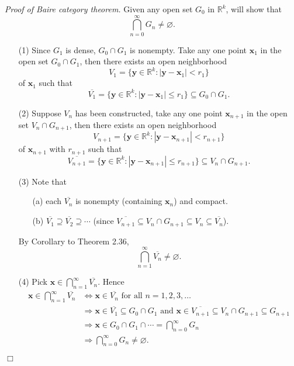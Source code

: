 \documentclass{article}
\begin{document}
\emph{Proof of Baire category theorem.}
Given any open set $G_0$ in $\mathbb{R}^k$,
will show that $$\bigcap_{n=0}^{\infty} G_n \neq \varnothing.$$
\begin{enumerate}
\item[(1)]
Since $G_1$ is dense, $G_0 \cap G_1$ is nonempty.
Take any one point $\mathbf{x}_1$ in the open set $G_0 \cap G_1$,
then there exists an open neighborhood
$$V_1
= \{ \mathbf{y} \in \mathbb{R}^k : |\mathbf{y} - \mathbf{x}_1| < r_1 \}$$
of $\mathbf{x}_1$
such that
$$\overline{V_1}
= \{ \mathbf{y} \in \mathbb{R}^k : |\mathbf{y} - \mathbf{x}_1| \leq r_1 \}
\subseteq G_0 \cap G_1.$$
\item[(2)]
Suppose $V_n$ has been constructed,
take any one point $\mathbf{x}_{n+1}$ in the open set $V_n \cap G_{n+1}$,
then there exists an open neighborhood
$$V_{n+1}
= \{ \mathbf{y} \in \mathbb{R}^k : |\mathbf{y} - \mathbf{x}_{n+1}| < r_{n+1} \}$$
of $\mathbf{x}_{n+1}$ with $r_{n+1}$
such that
$$\overline{V_{n+1}}
= \{ \mathbf{y} \in \mathbb{R}^k : |\mathbf{y} - \mathbf{x}_{n+1}| \leq r_{n+1} \}
\subseteq V_n \cap G_{n+1}.$$
\item[(3)]
Note that
  \begin{enumerate}
  \item[(a)]
  each $\overline{V_n}$ is nonempty (containing $\mathbf{x}_n$) and compact.
  \item[(b)]
  $\overline{V_1} \supseteq \overline{V_2} \supseteq \cdots$
  (since
  $\overline{V_{n+1}} \subseteq V_n \cap G_{n+1} \subseteq V_n \subseteq \overline{V_n}$).
  \end{enumerate}
By Corollary to Theorem 2.36,
$$\bigcap_{n=1}^{\infty} \overline{V_n} \neq \varnothing.$$
\item[(4)]
Pick $\mathbf{x} \in \bigcap_{n=1}^{\infty} \overline{V_n}$.
Hence
\begin{align*}
\mathbf{x} \in \bigcap_{n=1}^{\infty} \overline{V_n}
&\Longleftrightarrow
\mathbf{x} \in \overline{V_n} \text{ for all } n=1,2,3,\ldots \\
&\Longrightarrow
\mathbf{x} \in \overline{V_1} \subseteq G_0 \cap G_1 \text{ and }
\mathbf{x} \in \overline{V_{n+1}} \subseteq V_n \cap G_{n+1} \subseteq G_{n+1} \\
&\Longrightarrow
\mathbf{x} \in G_0 \cap G_1 \cap \cdots = \bigcap_{n=0}^{\infty} G_n \\
&\Longrightarrow
\bigcap_{n=0}^{\infty} G_n \neq \varnothing.
\end{align*}
\end{enumerate}
$\Box$ \\\\




\end{document}
